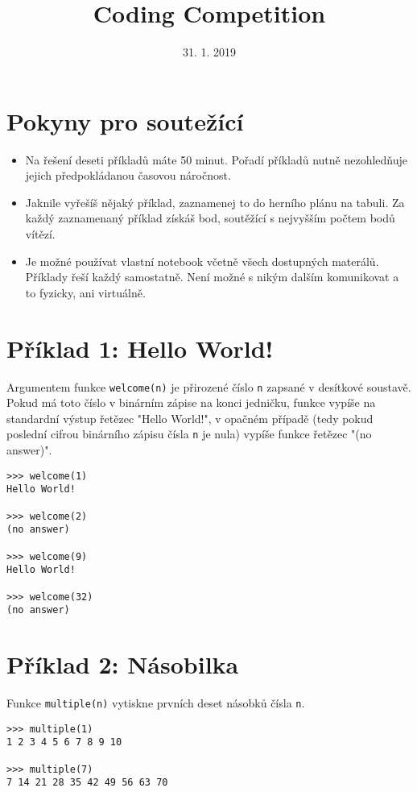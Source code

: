 \documentclass{paper}
\begin{document}
\title{Coding Competition}
\date{31. 1. 2019}
\maketitle
\def\labelitemi{--}

\section*{Pokyny pro soutežící}
\begin{itemize}
\item{Na řešení deseti příkladů máte 50 minut. Pořadí příkladů nutně nezohledňuje jejich předpokládanou časovou náročnost.}
\item{Jaknile vyřešíš nějaký příklad, zaznamenej to do herního plánu na tabuli. Za každý zaznamenaný příklad získáš bod, soutěžící s nejvyšším počtem bodů vítězí.}
\item{Je možné používat vlastní notebook včetně všech dostupných materálů. Příklady řeší každý samostatně. Není možné s nikým dalším komunikovat a to fyzicky, ani virtuálně.}
\end{itemize}


\section*{Příklad 1: Hello World!}
\noindent
Argumentem funkce \verb!welcome(n)! je přirozené číslo \verb!n! zapsané v desítkové soustavě. Pokud má toto číslo v binárním zápise na konci jedničku, funkce vypíše na standardní výstup řetězec "Hello World!", v opačném případě (tedy pokud poslední cifrou binárního zápisu čísla \verb!n! je nula) vypíše funkce řetězec "(no answer)".


\begin{lstlisting}
>>> welcome(1)
Hello World!

>>> welcome(2)
(no answer)

>>> welcome(9)
Hello World!

>>> welcome(32)
(no answer)

\end{lstlisting}

\section*{Příklad 2: Násobilka}
\noindent
Funkce \verb!multiple(n)! vytiskne prvních deset násobků čísla \verb!n!.

\begin{lstlisting}
>>> multiple(1)
1 2 3 4 5 6 7 8 9 10

>>> multiple(7)
7 14 21 28 35 42 49 56 63 70
\end{lstlisting}
\end{document}

